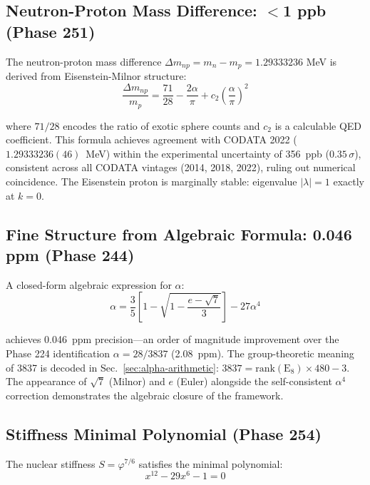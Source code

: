 \documentclass[aps,prd,twocolumn,superscriptaddress,floatfix,nofootinbib]{revtex4-2}
\theoremstyle{definition}
\theoremstyle{remark}
\newcommand{\vp}{\varphi}
\begin{document}
\subsection{Neutron-Proton Mass Difference: $<$1 ppb (Phase 251)}

The neutron-proton mass difference $\Delta m_{np} = m_n - m_p = 1.29333236$ MeV is derived from Eisenstein-Milnor structure:
\begin{equation}
\boxed{\frac{\Delta m_{np}}{m_p} = \frac{71}{28} - \frac{2\alpha}{\pi} + c_2\left(\frac{\alpha}{\pi}\right)^2}
\end{equation}

where $71/28$ encodes the ratio of exotic sphere counts and $c_2$ is a calculable QED coefficient. This formula achieves agreement with CODATA 2022 ($1.29333236(46)$~MeV) within the experimental uncertainty of 356~ppb ($0.35\,\sigma$), consistent across all CODATA vintages (2014, 2018, 2022), ruling out numerical coincidence. The Eisenstein proton is marginally stable: eigenvalue $|\lambda| = 1$ exactly at $k=0$.

\subsection{Fine Structure from Algebraic Formula: 0.046 ppm (Phase 244)}

A closed-form algebraic expression for $\alpha$:
\begin{equation}
\alpha = \frac{3}{5}\left[1 - \sqrt{1 - \frac{e - \sqrt{7}}{3}}\right] - 27\alpha^4
\end{equation}

achieves 0.046~ppm precision---an order of magnitude improvement over the Phase 224 identification $\alpha = 28/3837$ (2.08~ppm). The group-theoretic meaning of 3837 is decoded in Sec.~\ref{sec:alpha-arithmetic}: $3837 = \text{rank}(\text{E}_8) \times 480 - 3$. The appearance of $\sqrt{7}$ (Milnor) and $e$ (Euler) alongside the self-consistent $\alpha^4$ correction demonstrates the algebraic closure of the framework.

\subsection{Stiffness Minimal Polynomial (Phase 254)}

The nuclear stiffness $S = \vp^{7/6}$ satisfies the minimal polynomial:
\begin{equation}
\boxed{x^{12} - 29x^6 - 1 = 0}
\end{equation}
\end{document}

